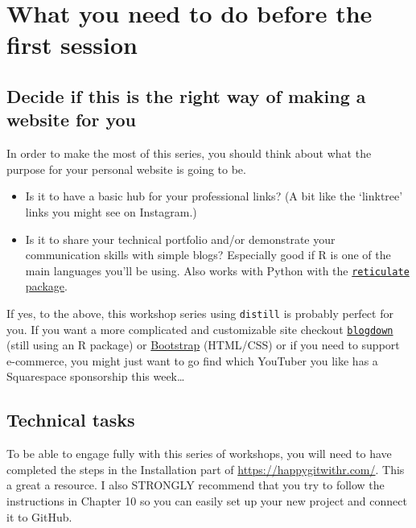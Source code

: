 \documentclass[
]{article}
\providecommand{\tightlist}{%
  \setlength{\itemsep}{0pt}\setlength{\parskip}{0pt}}
\begin{document}
\hypertarget{prereqs}{%
\section{What you need to do before the first session}\label{prereqs}}

\hypertarget{decide-if-this-is-the-right-way-of-making-a-website-for-you}{%
\subsection{Decide if this is the right way of making a website for you}\label{decide-if-this-is-the-right-way-of-making-a-website-for-you}}

In order to make the most of this series, you should think about what the purpose for your personal website is going to be.

\begin{itemize}
\tightlist
\item
  Is it to have a basic hub for your professional links? (A bit like the `linktree' links you might see on Instagram.)
\item
  Is it to share your technical portfolio and/or demonstrate your communication skills with simple blogs? Especially good if R is one of the main languages you'll be using. Also works with Python with the \href{https://rstudio.github.io/reticulate/}{\texttt{reticulate} package}.
\end{itemize}

If yes, to the above, this workshop series using \texttt{distill} is probably perfect for you. If you want a more complicated and customizable site checkout \href{https://bookdown.org/yihui/blogdown/}{\texttt{blogdown}} (still using an R package) or \href{https://www.w3schools.com/howto/howto_website_bootstrap.asp}{Bootstrap} (HTML/CSS) or if you need to support e-commerce, you might just want to go find which YouTuber you like has a Squarespace sponsorship this week\ldots{}

\hypertarget{technical-tasks}{%
\subsection{Technical tasks}\label{technical-tasks}}

To be able to engage fully with this series of workshops, you will need to have completed the steps in the Installation part of
\url{https://happygitwithr.com/}. This a great a resource. I also STRONGLY recommend that you try to follow the instructions in Chapter 10 so you can easily set up your new project and connect it to GitHub.
\end{document}
